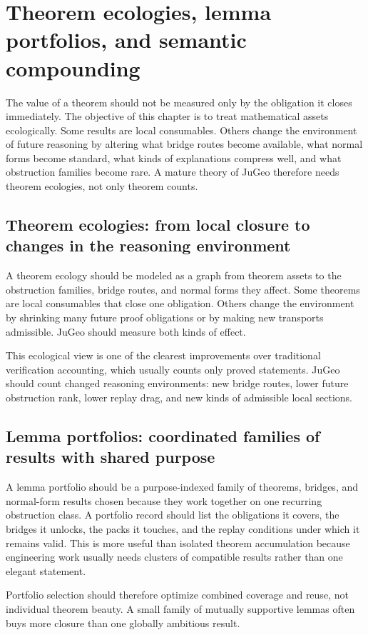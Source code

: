 \documentclass[11pt]{report}
\begin{document}
\chapter{Theorem ecologies, lemma portfolios, and semantic compounding}
The value of a theorem should not be measured only by the obligation it closes immediately. The objective of this chapter is to treat mathematical assets ecologically. Some results are local consumables. Others change the environment of future reasoning by altering what bridge routes become available, what normal forms become standard, what kinds of explanations compress well, and what obstruction families become rare. A mature theory of JuGeo therefore needs theorem ecologies, not only theorem counts.
\section{Theorem ecologies: from local closure to changes in the reasoning environment}
A theorem ecology should be modeled as a graph from theorem assets to the obstruction families, bridge routes, and normal forms they affect. Some theorems are local consumables that close one obligation. Others change the environment by shrinking many future proof obligations or by making new transports admissible. JuGeo should measure both kinds of effect.

This ecological view is one of the clearest improvements over traditional verification accounting, which usually counts only proved statements. JuGeo should count changed reasoning environments: new bridge routes, lower future obstruction rank, lower replay drag, and new kinds of admissible local sections.

\section{Lemma portfolios: coordinated families of results with shared purpose}
A lemma portfolio should be a purpose-indexed family of theorems, bridges, and normal-form results chosen because they work together on one recurring obstruction class. A portfolio record should list the obligations it covers, the bridges it unlocks, the packs it touches, and the replay conditions under which it remains valid. This is more useful than isolated theorem accumulation because engineering work usually needs clusters of compatible results rather than one elegant statement.

Portfolio selection should therefore optimize combined coverage and reuse, not individual theorem beauty. A small family of mutually supportive lemmas often buys more closure than one globally ambitious result.
\end{document}
